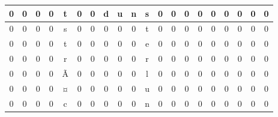 \documentclass[a4paper]{article}
\begin{document}
{\begin{tabular}{|c|c|c|c|c|c|c|c|c|c|c|c|c|c|c|c|c|c|c|c|}
\cellcolor{black}0 & \cellcolor{black}0 & \cellcolor{black}0 & \cellcolor{black}0 & t & \cellcolor{black}0 & \cellcolor{black}0 & d & u & n & s & \cellcolor{black}0 & \cellcolor{black}0 & \cellcolor{black}0 & \cellcolor{black}0 & \cellcolor{black}0 & \cellcolor{black}0 & \cellcolor{black}0 & \cellcolor{black}0 & \cellcolor{black}0\\ \hline
\cellcolor{black}0 & \cellcolor{black}0 & \cellcolor{black}0 & \cellcolor{black}0 & s & \cellcolor{black}0 & \cellcolor{black}0 & \cellcolor{black}0 & \cellcolor{black}0 & \cellcolor{black}0 & t & \cellcolor{black}0 & \cellcolor{black}0 & \cellcolor{black}0 & \cellcolor{black}0 & \cellcolor{black}0 & \cellcolor{black}0 & \cellcolor{black}0 & \cellcolor{black}0 & \cellcolor{black}0\\ \hline
\cellcolor{black}0 & \cellcolor{black}0 & \cellcolor{black}0 & \cellcolor{black}0 & t & \cellcolor{black}0 & \cellcolor{black}0 & \cellcolor{black}0 & \cellcolor{black}0 & \cellcolor{black}0 & e & \cellcolor{black}0 & \cellcolor{black}0 & \cellcolor{black}0 & \cellcolor{black}0 & \cellcolor{black}0 & \cellcolor{black}0 & \cellcolor{black}0 & \cellcolor{black}0 & \cellcolor{black}0\\ \hline
\cellcolor{black}0 & \cellcolor{black}0 & \cellcolor{black}0 & \cellcolor{black}0 & r & \cellcolor{black}0 & \cellcolor{black}0 & \cellcolor{black}0 & \cellcolor{black}0 & \cellcolor{black}0 & r & \cellcolor{black}0 & \cellcolor{black}0 & \cellcolor{black}0 & \cellcolor{black}0 & \cellcolor{black}0 & \cellcolor{black}0 & \cellcolor{black}0 & \cellcolor{black}0 & \cellcolor{black}0\\ \hline
\cellcolor{black}0 & \cellcolor{black}0 & \cellcolor{black}0 & \cellcolor{black}0 & Ã & \cellcolor{black}0 & \cellcolor{black}0 & \cellcolor{black}0 & \cellcolor{black}0 & \cellcolor{black}0 & l & \cellcolor{black}0 & \cellcolor{black}0 & \cellcolor{black}0 & \cellcolor{black}0 & \cellcolor{black}0 & \cellcolor{black}0 & \cellcolor{black}0 & \cellcolor{black}0 & \cellcolor{black}0\\ \hline
\cellcolor{black}0 & \cellcolor{black}0 & \cellcolor{black}0 & \cellcolor{black}0 & ¤ & \cellcolor{black}0 & \cellcolor{black}0 & \cellcolor{black}0 & \cellcolor{black}0 & \cellcolor{black}0 & u & \cellcolor{black}0 & \cellcolor{black}0 & \cellcolor{black}0 & \cellcolor{black}0 & \cellcolor{black}0 & \cellcolor{black}0 & \cellcolor{black}0 & \cellcolor{black}0 & \cellcolor{black}0\\ \hline
\cellcolor{black}0 & \cellcolor{black}0 & \cellcolor{black}0 & \cellcolor{black}0 & c & \cellcolor{black}0 & \cellcolor{black}0 & \cellcolor{black}0 & \cellcolor{black}0 & \cellcolor{black}0 & n & \cellcolor{black}0 & \cellcolor{black}0 & \cellcolor{black}0 & \cellcolor{black}0 & \cellcolor{black}0 & \cellcolor{black}0 & \cellcolor{black}0 & \cellcolor{black}0 & \cellcolor{black}0\\ \hline

\end{tabular}}
\end{document}
